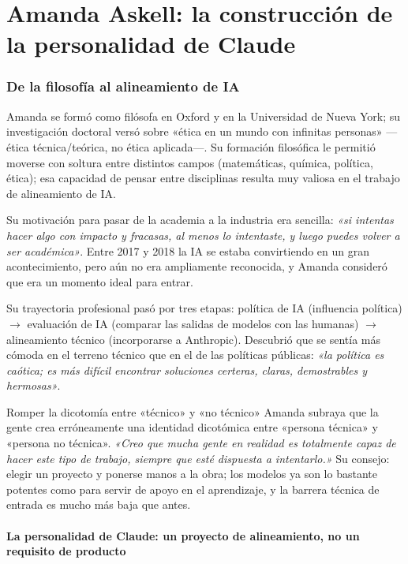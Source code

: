 \documentclass[a4paper]{article}
\begin{document}
\part{Amanda Askell: la construcción de la personalidad de Claude}

\section{De la filosofía al alineamiento de IA}

Amanda se formó como filósofa en Oxford y en la Universidad de Nueva York; su investigación doctoral versó sobre «ética en un mundo con infinitas personas» —ética técnica/teórica, no ética aplicada—. Su formación filosófica le permitió moverse con soltura entre distintos campos (matemáticas, química, política, ética); esa capacidad de pensar entre disciplinas resulta muy valiosa en el trabajo de alineamiento de IA.

Su motivación para pasar de la academia a la industria era sencilla: \textit{«si intentas hacer algo con impacto y fracasas, al menos lo intentaste, y luego puedes volver a ser académica»}. Entre 2017 y 2018 la IA se estaba convirtiendo en un gran acontecimiento, pero aún no era ampliamente reconocida, y Amanda consideró que era un momento ideal para entrar.

Su trayectoria profesional pasó por tres etapas: política de IA (influencia política) $\to$ evaluación de IA (comparar las salidas de modelos con las humanas) $\to$ alineamiento técnico (incorporarse a Anthropic). Descubrió que se sentía más cómoda en el terreno técnico que en el de las políticas públicas: \textit{«la política es caótica; es más difícil encontrar soluciones certeras, claras, demostrables y hermosas»}.

\begin{knowledgebox}{Romper la dicotomía entre «técnico» y «no técnico»}
Amanda subraya que la gente crea erróneamente una identidad dicotómica entre «persona técnica» y «persona no técnica». \textit{«Creo que mucha gente en realidad es totalmente capaz de hacer este tipo de trabajo, siempre que esté dispuesta a intentarlo.»} Su consejo: elegir un proyecto y ponerse manos a la obra; los modelos ya son lo bastante potentes como para servir de apoyo en el aprendizaje, y la barrera técnica de entrada es mucho más baja que antes.
\end{knowledgebox}

\subsection{La personalidad de Claude: un proyecto de alineamiento, no un requisito de producto}
\end{document}

